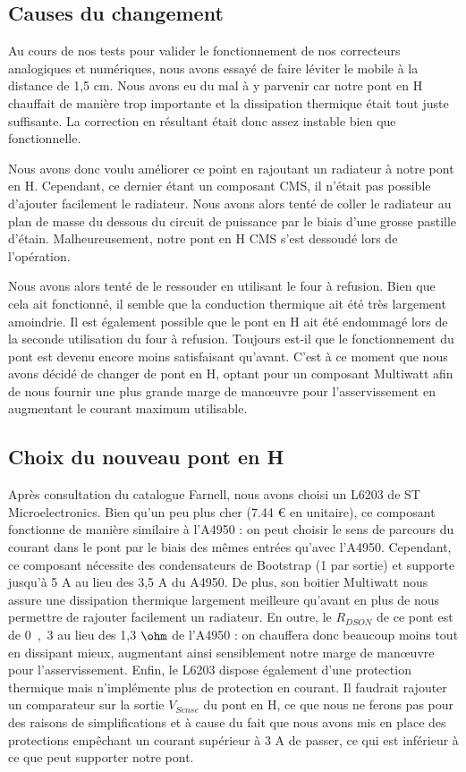 \documentclass[11pt, french]{article} %
\begin{document}
\subsection{Causes du changement}
Au cours de nos tests pour valider le fonctionnement de nos correcteurs analogiques et numériques, nous avons essayé de faire léviter le mobile à la distance de 1,5 cm. Nous avons eu du mal à y parvenir car notre pont en H chauffait de manière trop importante et la dissipation thermique était tout juste suffisante. La correction en résultant était donc assez instable bien que fonctionnelle. 

Nous avons donc voulu améliorer ce point en rajoutant un radiateur à notre pont en H. Cependant, ce dernier étant un composant CMS, il n'était pas possible d'ajouter facilement le radiateur. Nous avons alors tenté de coller le radiateur au plan de masse du dessous du circuit de puissance par le biais d'une grosse pastille d'étain. Malheureusement, notre pont en H CMS s'est dessoudé lors de l'opération.

Nous avons alors tenté de le ressouder en utilisant le four à refusion. Bien que cela ait fonctionné, il semble que la conduction thermique ait été très largement amoindrie. Il est également possible que le pont en H ait été endommagé lors de la seconde utilisation du four à refusion. Toujours est-il que le fonctionnement du pont est devenu encore moins satisfaisant qu'avant. C'est à ce moment que nous avons décidé de changer de pont en H, optant pour un composant Multiwatt afin de nous fournir une plus grande marge de manœuvre pour l'asservissement en augmentant le courant maximum utilisable. 

\subsection{Choix du nouveau pont en H}

Après consultation du catalogue Farnell, nous avons choisi un L6203 de ST Microelectronics. Bien qu'un peu plus cher (7.44 \euro{} en unitaire), ce composant fonctionne de manière similaire à l'A4950 : on peut choisir le sens de parcours du courant dans le pont par le biais des mêmes entrées qu'avec l'A4950. Cependant, ce composant nécessite des condensateurs de Bootstrap (1 par sortie) et supporte jusqu'à 5 A au lieu des 3,5 A du A4950. De plus, son boitier Multiwatt nous assure une dissipation thermique largement meilleure qu'avant en plus de nous permettre de rajouter facilement un radiateur. En outre, le $R_{DSON}$ de ce pont est de \unit{0,3}{\ohm} au lieu des 1,3 $\ohm$ de l'A4950 : on chauffera donc beaucoup moins tout en dissipant mieux, augmentant ainsi sensiblement notre marge de manœuvre pour l'asservissement. Enfin, le L6203 dispose également d'une protection thermique mais n'implémente plus de protection en courant. Il faudrait rajouter un comparateur sur la sortie $V_{Sense}$ du pont en H, ce que nous ne ferons pas pour des raisons de simplifications et à cause du fait que nous avons mis en place des protections empêchant un courant supérieur à 3 A de passer, ce qui est inférieur à ce que peut supporter notre pont. 
\end{document}
